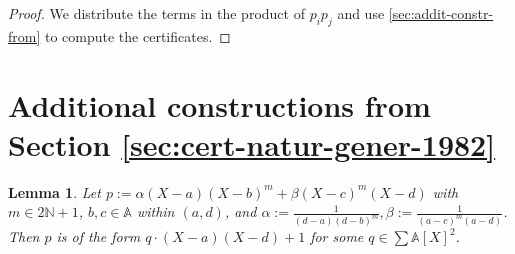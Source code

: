 \documentclass[preprint,12pt,authoryear]{elsarticle}
\newtheorem{lemma}[theorem]{Lemma}
\newtheorem{proof}[theorem]{Proof}
\newcommand{\aX}{\mathbb{A}[X]}
\begin{document}
\begin{proof}
  We distribute the terms in the product of $p_i p_j$ and use
  \th\ref{sec:addit-constr-from} to compute the certificates.
\end{proof}

 \section{Additional constructions from Section \ref{sec:cert-natur-gener-1982}}
\label{appendix-sec-4}

\begin{lemma} \th\label{sec:splitting-step-7} Let
  $p := \alpha(X-a)(X-b)^{m} + \beta(X-c)^{m}(X-d)$ with
  $m \in 2\mathbb{N} + 1$, $b, c \in \mathbb{A}$ within $(a, d)$, and
  $\alpha := \frac{1}{(d-a)(d-b)^{m}}, \beta := \frac{1}{(a-c)^{m}(a-d)}$. Then
  $p$ is of the form $q \cdot (X-a)(X-d) + 1$ for some $q \in \sum{\aX}^2$.
\end{lemma}
\end{document}
